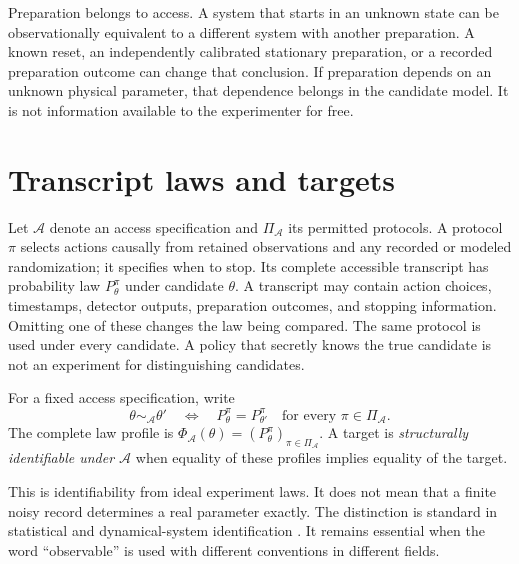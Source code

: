 Preparation belongs to access. A system that starts in an unknown state can
be observationally equivalent to a different system with another preparation.
A known reset, an independently calibrated stationary preparation, or a
recorded preparation outcome can change that conclusion. If preparation
depends on an unknown physical parameter, that dependence belongs in the
candidate model. It is not information available to the experimenter for
free.

\section{Transcript laws and targets}

Let $\mathcal A$ denote an access specification and $\Pi_{\mathcal A}$ its
permitted protocols. A protocol $\pi$ selects actions causally from retained
observations and any recorded or modeled randomization; it specifies when
to stop. Its complete accessible transcript has probability law
$P_\theta^\pi$ under candidate $\theta$. A transcript may contain action
choices, timestamps, detector outputs, preparation outcomes, and stopping
information. Omitting one of these changes the law being compared.
The same protocol is used under every candidate. A policy that secretly
knows the true candidate is not an experiment for distinguishing candidates.

\begin{definition}\label{foundations:equivalence}
For a fixed access specification, write
\begin{equation}
 \theta\sim_{\mathcal A}\theta'
 \quad\Longleftrightarrow\quad
 P_\theta^\pi=P_{\theta'}^\pi
 \quad\text{for every }\pi\in\Pi_{\mathcal A}.
\end{equation}
The complete law profile is
$\Phi_{\mathcal A}(\theta)=(P_\theta^\pi)_{\pi\in\Pi_{\mathcal A}}$.
A target is \emph{structurally identifiable under $\mathcal A$} when
equality of these profiles implies equality of the target.
\end{definition}

This is identifiability from ideal experiment laws. It does not mean that
a finite noisy record determines a real parameter exactly. The distinction
is standard in statistical and dynamical-system identification
\cite{f_nemcova,f_thon}. It remains essential when the word ``observable''
is used with different conventions in different fields.

